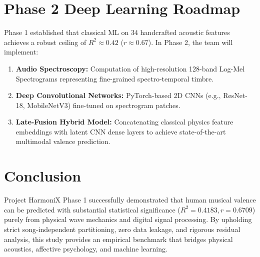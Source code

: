 \documentclass[conference]{IEEEtran}
\begin{document}
\section{Phase 2 Deep Learning Roadmap}
Phase 1 established that classical ML on 34 handcrafted acoustic features achieves a robust ceiling of $R^2 \approx 0.42$ ($r \approx 0.67$). In Phase 2, the team will implement:
\begin{enumerate}
    \item \textbf{Audio Spectroscopy:} Computation of high-resolution 128-band Log-Mel Spectrograms representing fine-grained spectro-temporal timbre.
    \item \textbf{Deep Convolutional Networks:} PyTorch-based 2D CNNs (e.g., ResNet-18, MobileNetV3) fine-tuned on spectrogram patches.
    \item \textbf{Late-Fusion Hybrid Model:} Concatenating classical physics feature embeddings with latent CNN dense layers to achieve state-of-the-art multimodal valence prediction.
\end{enumerate}

\section{Conclusion}
Project HarmoniX Phase 1 successfully demonstrated that human musical valence can be predicted with substantial statistical significance ($R^2 = 0.4183, r = 0.6709$) purely from physical wave mechanics and digital signal processing. By upholding strict song-independent partitioning, zero data leakage, and rigorous residual analysis, this study provides an empirical benchmark that bridges physical acoustics, affective psychology, and machine learning.
\end{document}
